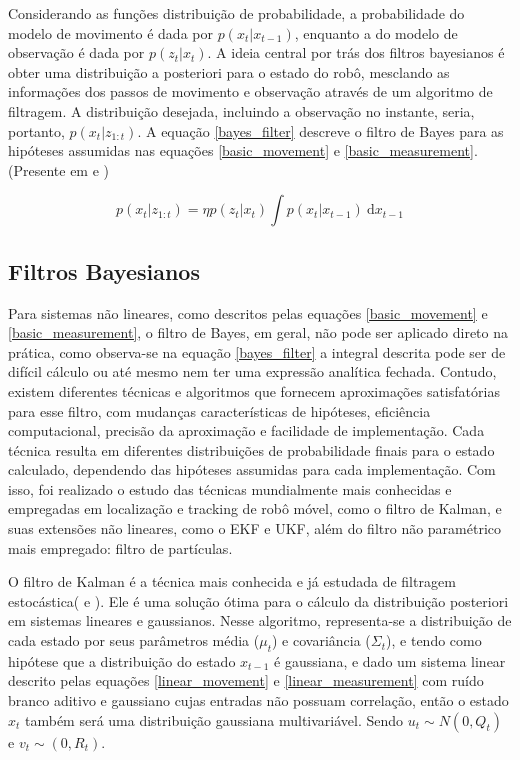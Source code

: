 \documentclass[paper=a4, fontsize=11pt]{scrartcl}
\begin{document}
Considerando as funções distribuição de probabilidade, a probabilidade do modelo de movimento é dada por $p(x_t |x_{t-1})$, enquanto a do modelo de observação é dada por $p(z_t |x_t)$. A ideia central por trás dos filtros bayesianos é obter uma distribuição a posteriori para o estado do robô, mesclando as informações dos passos de movimento e observação através de um algoritmo de filtragem. A distribuição desejada, incluindo a observação no instante, seria, portanto, $p(x_t |z_{1:t})$. A equação \eqref{bayes_filter} descreve o filtro de Bayes para as hipóteses assumidas nas equações \eqref{basic_movement} e \eqref{basic_measurement}. (Presente em  e )

\begin{equation}
\label{bayes_filter}
    p(x_t|z_{1:t})=\eta p(z_t|x_t) \int p(x_t|x_{t-1})\: \mathrm{d}x_{t-1}
\end{equation}

\subsection{Filtros Bayesianos}

Para sistemas não lineares, como descritos pelas equações \eqref{basic_movement} e \eqref{basic_measurement}, o filtro de Bayes, em geral, não pode ser aplicado direto na prática, como observa-se na equação \eqref{bayes_filter} a integral descrita pode ser de difícil cálculo ou até mesmo nem ter uma expressão analítica fechada. Contudo, existem diferentes técnicas e algoritmos que fornecem aproximações satisfatórias para esse filtro, com mudanças características de hipóteses, eficiência computacional, precisão da aproximação e facilidade de implementação. Cada técnica resulta em diferentes distribuições de probabilidade finais para o estado calculado, dependendo das hipóteses assumidas para cada implementação. Com isso, foi realizado o estudo das técnicas mundialmente mais conhecidas e empregadas em localização e tracking de robô móvel, como o filtro de Kalman, e suas extensões não lineares, como o EKF e UKF, além do filtro não paramétrico mais empregado: filtro de partículas.

O filtro de Kalman é a técnica mais conhecida e já estudada de filtragem estocástica(\cite{P.Robotics} e \cite{Optimal_Filtering}). Ele é uma solução ótima para o cálculo da distribuição posteriori em sistemas lineares e gaussianos. Nesse algoritmo, representa-se a distribuição de cada estado por seus parâmetros média ($\mu_t$) e covariância ($\Sigma_t$), e tendo como hipótese que a distribuição do estado $x_{t-1}$ é gaussiana, e dado um sistema linear descrito pelas equações \eqref{linear_movement} e \eqref{linear_measurement} com ruído branco aditivo e gaussiano cujas entradas não possuam correlação, então o estado $x_t$ também será uma distribuição gaussiana multivariável. Sendo $u_t\sim N(0,Q_t)$ e $v_t\sim (0,R_t)$.
\end{document}
